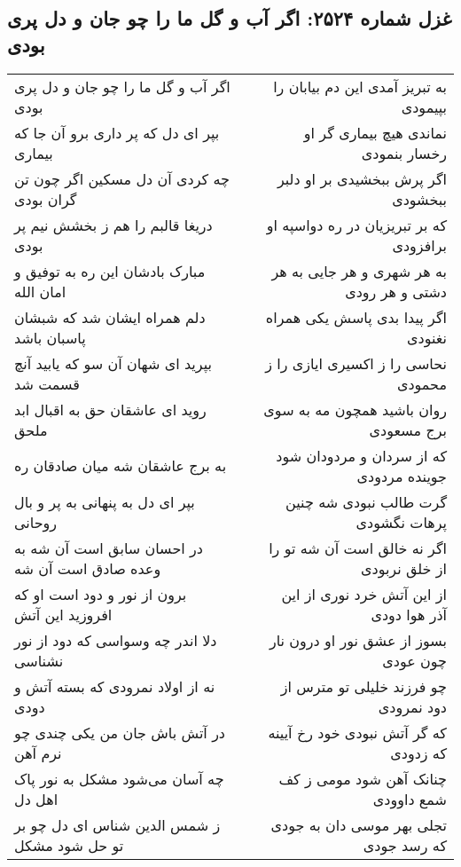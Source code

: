 \begin{center}
\section*{غزل شماره ۲۵۲۴: اگر آب و گل ما را چو جان و دل پری بودی}
\label{sec:2524}
\begin{longtable}{l p{0.5cm} r}
اگر آب و گل ما را چو جان و دل پری بودی
&&
به تبریز آمدی این دم بیابان را بپیمودی
\\
بپر ای دل که پر داری برو آن جا که بیماری
&&
نماندی هیچ بیماری گر او رخسار بنمودی
\\
چه کردی آن دل مسکین اگر چون تن گران بودی
&&
اگر پرش ببخشیدی بر او دلبر ببخشودی
\\
دریغا قالبم را هم ز بخشش نیم پر بودی
&&
که بر تبریزیان در ره دواسپه او برافزودی
\\
مبارک بادشان این ره به توفیق و امان الله
&&
به هر شهری و هر جایی به هر دشتی و هر رودی
\\
دلم همراه ایشان شد که شبشان پاسبان باشد
&&
اگر پیدا بدی پاسش یکی همراه نغنودی
\\
بپرید ای شهان آن سو که یابید آنچ قسمت شد
&&
نحاسی را ز اکسیری ایازی را ز محمودی
\\
روید ای عاشقان حق به اقبال ابد ملحق
&&
روان باشید همچون مه به سوی برج مسعودی
\\
به برج عاشقان شه میان صادقان ره
&&
که از سردان و مردودان شود جوینده مردودی
\\
بپر ای دل به پنهانی به پر و بال روحانی
&&
گرت طالب نبودی شه چنین پرهات نگشودی
\\
در احسان سابق است آن شه به وعده صادق است آن شه
&&
اگر نه خالق است آن شه تو را از خلق نربودی
\\
برون از نور و دود است او که افروزید این آتش
&&
از این آتش خرد نوری از این آذر هوا دودی
\\
دلا اندر چه وسواسی که دود از نور نشناسی
&&
بسوز از عشق نور او درون نار چون عودی
\\
نه از اولاد نمرودی که بسته آتش و دودی
&&
چو فرزند خلیلی تو مترس از دود نمرودی
\\
در آتش باش جان من یکی چندی چو نرم آهن
&&
که گر آتش نبودی خود رخ آیینه که زدودی
\\
چه آسان می‌شود مشکل به نور پاک اهل دل
&&
چنانک آهن شود مومی ز کف شمع داوودی
\\
ز شمس الدین شناس ای دل چو بر تو حل شود مشکل
&&
تجلی بهر موسی دان به جودی که رسد جودی
\\
\end{longtable}
\end{center}
